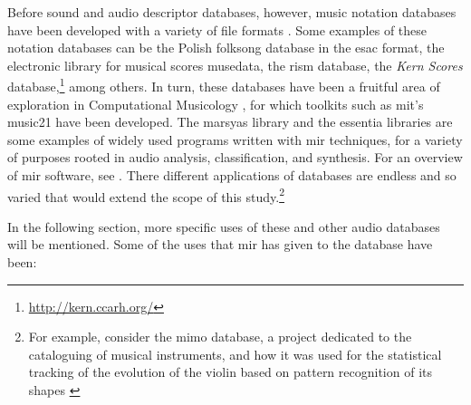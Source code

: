 Before sound and audio descriptor databases, however, music notation databases have been developed with a variety of file formats . Some examples of these notation databases can be the Polish folksong database in the \gls{esac} format, the electronic library for musical scores \gls{musedata}, the \gls{rism} database, the \textit{Kern Scores} database,\footnote{\url{http://kern.ccarh.org/}} among others. In turn, these databases have been a fruitful area of exploration in Computational Musicology \parencite{DBLP:conf/iciso/Yokl11}, for which toolkits such as \gls{mit}'s \gls{music21} have been developed. The \gls{marsyas} library \parencite{tzanetakis_cook_2000} and the \gls{essentia} \parencite{DBLP:conf/ismir/BogdanovWGGHMRSZS13} libraries are some examples of widely used programs written with \gls{mir} techniques, for a variety of purposes rooted in audio analysis, classification, and synthesis. For an overview of \gls{mir} software, see \parencite{DBLP:conf/ismir/BogdanovWGGHMRSZS13}. There different applications of databases are endless and so varied that would extend the scope of this study.\footnote{For example, consider the \gls{mimo} database, a project dedicated to the cataloguing of musical instruments, and how it was used for the statistical tracking of the evolution of the violin based on pattern recognition of its shapes \parencite{2018arXiv180802848P}}

In the following section, more specific uses of these and other audio databases will be mentioned. Some of the uses that \gls{mir} has given to the database have been:

